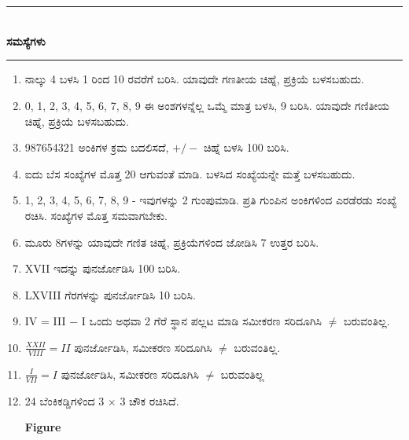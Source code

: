 \chapter{}\label{chap2}

\begin{center}
\rule{5cm}{1pt}\\[5pt]
{\Large\bfseries ಸಮಸ್ಯೆಗಳು}\\[3pt]
\rule{5cm}{1pt}
\end{center}

\smallskip
\begin{enumerate}
\renewcommand{\labelenumi}{\bf\theenumi.}
\itemsep=5pt
\item ನಾಲ್ಕು 4 ಬಳಸಿ 1 ರಿಂದ 10 ರವರೆಗೆ ಬರಿಸಿ. ಯಾವುದೇ ಗಣತೀಯ ಚಿಹ್ನೆ, ಪ್ರಕ್ರಿಯೆ ಬಳಸಬಹುದು.

\item 0, 1, 2, 3, 4, 5, 6, 7, 8, 9 ಈ ಅಂಶಗಳನ್ನೆಲ್ಲ ಒಮ್ಮೆ ಮಾತ್ರ ಬಳಸಿ, 9 ಬರಿಸಿ. ಯಾವುದೇ ಗಣಿತೀಯ ಚಿಹ್ನೆ, ಪ್ರಕ್ರಿಯೆ ಬಳಸಬಹುದು. 

\item 987654321 ಅಂಕಿಗಳ ಕ್ರಮ ಬದಲಿಸದೆ, $+/-$ ಚಿಹ್ನೆ ಬಳಸಿ 100 ಬರಿಸಿ.

\item ಐದು ಬೆಸ ಸಂಖ್ಯೆಗಳ ಮೊತ್ತ 20 ಆಗುವಂತೆ ಮಾಡಿ. ಬಳಸಿದ ಸಂಖ್ಯೆಯನ್ನೇ ಮತ್ತೆ ಬಳಸಬಹುದು. 

\item 1, 2, 3, 4, 5, 6, 7, 8, 9 - ಇವುಗಳನ್ನು 2 ಗುಂಪುಮಾಡಿ. ಪ್ರತಿ ಗುಂಪಿನ ಅಂಕಿಗಳಿಂದ ಎರಡೆರಡು ಸಂಖ್ಯೆ ರಚಿಸಿ. ಸಂಖ್ಯೆಗಳ ಮೊತ್ತ ಸಮವಾಗಬೇಕು. 

\item ಮೂರು 8ಗಳನ್ನು ಯಾವುದೇ ಗಣಿತ ಚಿಹ್ನೆ, ಪ್ರಕ್ರಿಯೆಗಳಿಂದ ಜೋಡಿಸಿ 7 ಉತ್ತರ ಬರಿಸಿ.

\item XVII ಇದನ್ನು ಪುನರ್ಜೋಡಿಸಿ 100 ಬರಿಸಿ.

\item LXVIII ಗೆರಗಳನ್ನು ಪುನರ್ಜೋಡಿಸಿ 10 ಬರಿಸಿ. 

\item IV = III $-$ I ಒಂದು ಅಥವಾ 2 ಗೆರೆ ಸ್ಥಾನ ಪಲ್ಲಟ ಮಾಡಿ ಸಮೀಕರಣ ಸರಿದೂಗಿಸಿ $\neq$ ಬರುವಂತಿಲ್ಲ.

\item $\frac{XXII}{VIII} = II$ ಪುನರ್ಜೋಡಿಸಿ, ಸಮೀಕರಣ ಸರಿದೂಗಿಸಿ $\neq$ ಬರುವಂತಿಲ್ಲ.

\item $\frac{I}{VII} = I$ ಪುನರ್ಜೋಡಿಸಿ, ಸಮೀಕರಣ ಸರಿದೂಗಿಸಿ $\neq$ ಬರುವಂತಿಲ್ಲ

\item 24 ಬೆಂಕಿಕಡ್ಡಿಗಳಿಂದ 3 $\times$ 3 ಚೌಕ ರಚಿಸಿದೆ.

\begin{center}
{\bf Figure}
\end{center}


\end{enumerate}
